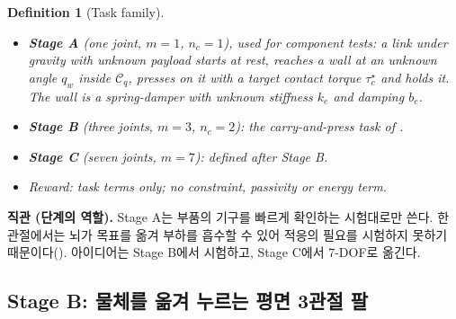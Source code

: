 \documentclass[11pt]{article}\usepackage[margin=1in]{geometry}\usepackage{amsmath,amssymb,amsthm,mathtools}\usepackage{graphicx}\graphicspath{{figures/}{../figures/}{figs/}{./}}\usepackage{enumitem}\usepackage{hyperref}\usepackage{cleveref}\usepackage{tikz}\usetikzlibrary{arrows.meta,positioning,calc,shapes.geometric}\usepackage{float}\usepackage{rotating}\usepackage[most]{tcolorbox}\usepackage{kotex}\usepackage{booktabs}\usepackage{longtable}\emergencystretch=1.6em\tolerance=2000 \crefname{assumption}{Assumption}{Assumptions}\Crefname{assumption}{Assumption}{Assumptions}\crefname{definition}{Definition}{Definitions}\Crefname{definition}{Definition}{Definitions}\crefname{proposition}{Proposition}{Propositions}\Crefname{proposition}{Proposition}{Propositions}\crefname{fact}{Fact}{Facts}\Crefname{fact}{Fact}{Facts} \newtheorem{assumption}{Assumption}\newtheorem{definition}{Definition}\newtheorem{lemma}{Lemma}\newtheorem{proposition}{Proposition}\newtheorem{theorem}{Theorem}\newtheorem{corollary}{Corollary}\newtheorem{fact}{Fact}\theoremstyle{remark}\newtheorem{remark}{Remark} \newcommand{\R}{\mathbb{R}}\newcommand{\xb}{\bar x}\newcommand{\Ab}{\bar A}\newcommand{\By}{\bar B_y}\newcommand{\U}{\mathcal U}\newcommand{\Z}{\mathcal Z}
\begin{document}
\begin{definition}[Task family]
\label{def:tasks}
\begin{itemize}
\item \textbf{Stage A} (one joint, $m=1$, $n_c=1$), used for component tests: a link under gravity with unknown payload starts at rest, reaches a wall at an unknown angle $q_w$ inside $\mathcal C_q$, presses on it with a target contact torque $\tau_c^\star$ and holds it. The wall is a spring-damper with unknown stiffness $k_e$ and damping $b_e$.
\item \textbf{Stage B} (three joints, $m=3$, $n_c=2$): the carry-and-press task of .
\item \textbf{Stage C} (seven joints, $m=7$): defined after Stage B.
\item Reward: task terms only; no constraint, passivity or energy term.
\end{itemize}
\end{definition}

\textbf{직관 (단계의 역할).} Stage A는 부품의 기구를 빠르게 확인하는 시험대로만 쓴다. 한 관절에서는 뇌가 목표를 옮겨 부하를 흡수할 수 있어 적응의 필요를 시험하지 못하기 때문이다(). 아이디어는 Stage B에서 시험하고, Stage C에서 7-DOF로 옮긴다.

\subsection{Stage B: 물체를 옮겨 누르는 평면 3관절 팔}
\label{sec:stageB}
\end{document}
